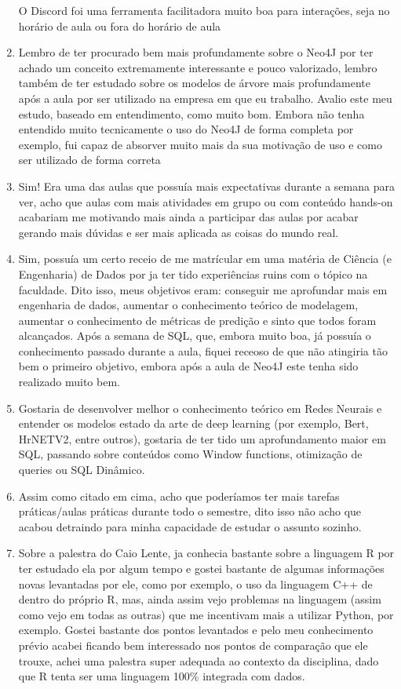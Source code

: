 \documentclass{article}
\begin{document}
\begin{enumerate}
O Discord foi uma ferramenta facilitadora muito boa para interações, seja no horário de aula ou fora do horário de aula
\item Lembro de ter procurado bem mais profundamente sobre o Neo4J por ter achado um conceito extremamente interessante e pouco valorizado, lembro também de ter estudado sobre os modelos de árvore mais profundamente após a aula por ser utilizado na empresa em que eu trabalho.
Avalio este meu estudo, baseado em entendimento, como muito bom. Embora não tenha entendido muito tecnicamente o uso do Neo4J de forma completa por exemplo, fui capaz de absorver muito mais da sua motivação de uso e como ser utilizado de forma correta
\item Sim! Era uma das aulas que possuía mais expectativas durante a semana para ver, acho que aulas com mais atividades em grupo ou com conteúdo hands-on acabariam me motivando mais ainda a participar das aulas por acabar gerando mais dúvidas e ser mais aplicada as coisas do mundo real.
\item Sim, possuía um certo receio de me matrícular em uma matéria de Ciência (e Engenharia) de Dados por ja ter tido experiências ruins com o tópico na faculdade. Dito isso, meus objetivos eram: conseguir me aprofundar mais em engenharia de dados, aumentar o conhecimento teórico de modelagem, aumentar o conhecimento de métricas de predição e sinto que todos foram alcançados.
Após a semana de SQL, que, embora muito boa, já possuía o conhecimento passado durante a aula, fiquei receoso de que não atingiria tão bem o primeiro objetivo, embora após a aula de Neo4J este tenha sido realizado muito bem.
\item Gostaria de desenvolver melhor o conhecimento teórico em Redes Neurais e entender os modelos estado da arte de deep learning (por exemplo, Bert, HrNETV2, entre outros), gostaria de ter tido um aprofundamento maior em SQL, passando sobre conteúdos como Window functions, otimização de queries ou SQL Dinâmico.
\item Assim como citado em cima, acho que poderíamos ter mais tarefas práticas/aulas práticas durante todo o semestre, dito isso não acho que acabou detraindo para minha capacidade de estudar o assunto sozinho.
\item Sobre a palestra do Caio Lente, ja conhecia bastante sobre a linguagem R por ter estudado ela por algum tempo e gostei bastante de algumas informações novas levantadas por ele, como por exemplo, o uso da linguagem C++ de dentro do próprio R, mas, ainda assim vejo problemas na linguagem (assim como vejo em todas as outras) que me incentivam mais a utilizar Python, por exemplo. Gostei bastante dos pontos levantados e pelo meu conhecimento prévio acabei ficando bem interessado nos pontos de comparação que ele trouxe, achei uma palestra super adequada ao contexto da disciplina, dado que R tenta ser uma linguagem 100\% integrada com dados.


\end{enumerate}
\end{document}

